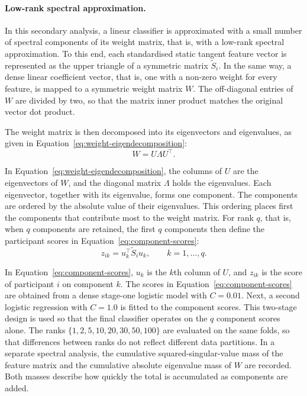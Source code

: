 \paragraph{\textbf{Low-rank spectral approximation.}}
\label{par:low-rank-spectral}
In this secondary analysis, a linear classifier is approximated with a small number of
spectral components of its weight matrix, that is, with a low-rank spectral approximation.
To this end, each standardised static tangent feature vector is represented as the upper
triangle of a symmetric matrix $\widetilde{S}_i$. In the same way, a dense linear
coefficient vector, that is, one with a non-zero weight for every feature, is mapped to a
symmetric weight matrix $W$. The off-diagonal entries of $W$ are divided by two, so that
the matrix inner product matches the original vector dot product.

The weight matrix is then decomposed into its eigenvectors and eigenvalues, as given in
Equation~\eqref{eq:weight-eigendecomposition}:
\begin{equation}
W
=
U\Lambda U^\top.
\label{eq:weight-eigendecomposition}
\end{equation}

In Equation~\eqref{eq:weight-eigendecomposition}, the columns of $U$ are the eigenvectors of $W$, and the diagonal
matrix $\Lambda$ holds the eigenvalues. Each eigenvector, together with its eigenvalue,
forms one component. The components are ordered by the absolute value of their eigenvalues.
This ordering places first the components that contribute most to the weight matrix. For
rank $q$, that is, when $q$ components are retained, the first $q$ components then define
the participant scores in Equation~\eqref{eq:component-scores}:
\begin{equation}
z_{ik}
=
u_k^\top \widetilde{S}_i u_k,
\qquad k=1,\ldots,q.
\label{eq:component-scores}
\end{equation}

In Equation~\eqref{eq:component-scores}, $u_k$ is the $k$th column of $U$, and $z_{ik}$ is the score of
participant $i$ on component $k$. The scores in Equation~\eqref{eq:component-scores} are obtained from a
dense stage-one logistic model with $C=0.01$. Next, a second logistic regression with
$C=1.0$ is fitted to the component scores. This two-stage design is used so that the final
classifier operates on the $q$ component scores alone. The ranks $\{1,2,5,10,20,30,50,100\}$
are evaluated on the same folds, so that differences between ranks do not reflect different
data partitions. In a separate spectral analysis, the cumulative squared-singular-value mass
of the feature matrix and the cumulative absolute eigenvalue mass of $W$ are recorded. Both
masses describe how quickly the total is accumulated as components are added.

